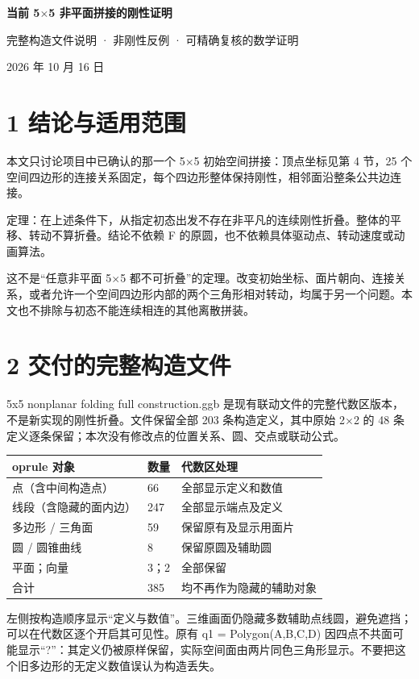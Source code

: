 \documentclass[UTF8,a4paper,11pt]{ctexart}
\begin{document}
\begin{center}\LARGE\bfseries 当前 5\(\times\)5 非平面拼接的刚性证明\end{center}
\begin{center}完整构造文件说明 · 非刚性反例 · 可精确复核的数学证明\end{center}
\begin{center}2026 年 10 月 16 日\end{center}
\section*{1  结论与适用范围}
本文只讨论项目中已确认的那一个 5\(\times\)5 初始空间拼接：顶点坐标见第 4 节，25 个空间四边形的连接关系固定，每个四边形整体保持刚性，相邻面沿整条公共边连接。

定理：在上述条件下，从指定初态出发不存在非平凡的连续刚性折叠。整体的平移、转动不算折叠。结论不依赖 F 的原圆，也不依赖具体驱动点、转动速度或动画算法。

这不是“任意非平面 5\(\times\)5 都不可折叠”的定理。改变初始坐标、面片朝向、连接关系，或者允许一个空间四边形内部的两个三角形相对转动，均属于另一个问题。本文也不排除与初态不能连续相连的其他离散拼装。

\section*{2  交付的完整构造文件}
5x5 nonplanar folding full construction.ggb 是现有联动文件的完整代数区版本，不是新实现的刚性折叠。文件保留全部 203 条构造定义，其中原始 2\(\times\)2 的 48 条定义逐条保留；本次没有修改点的位置关系、圆、交点或联动公式。

\begin{longtable}{lll}	oprule
对象 & 数量 & 代数区处理 \\ \midrule
点（含中间构造点） & 66 & 全部显示定义和数值 \\
线段（含隐藏的面内边） & 247 & 全部显示端点及定义 \\
多边形 / 三角面 & 59 & 保留原有及显示用面片 \\
圆 / 圆锥曲线 & 8 & 保留原圆及辅助圆 \\
平面；向量 & 3；2 & 全部保留 \\
合计 & 385 & 均不再作为隐藏的辅助对象 \\
\bottomrule\end{longtable}
左侧按构造顺序显示“定义与数值”。三维画面仍隐藏多数辅助点线圆，避免遮挡；可以在代数区逐个开启其可见性。原有 q1 = Polygon(A,B,C,D) 因四点不共面可能显示“?”：其定义仍被原样保留，实际空间面由两片同色三角形显示。不要把这个旧多边形的无定义数值误认为构造丢失。
\end{document}
